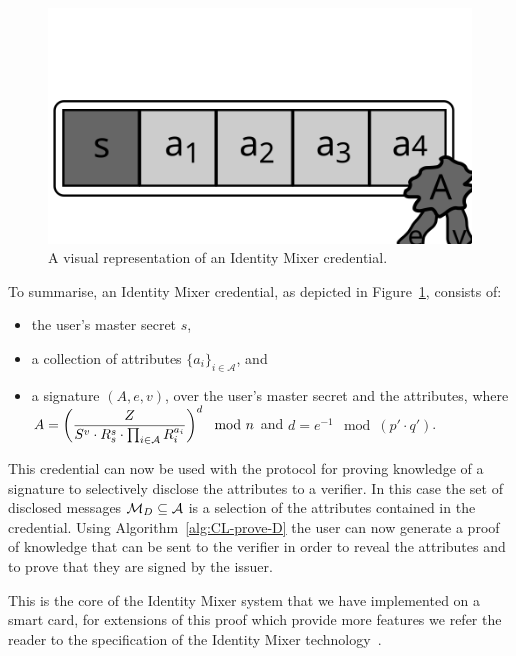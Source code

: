 \clearpage
\begin{figure}[ht]
  \centering
  \includegraphics[scale=.45]{images/idemix-credential}
  \caption{A visual representation of an Identity Mixer credential.}
  \label{fig:idemix-credential}
\end{figure}

\noindent To summarise, an Identity Mixer credential, as depicted in
Figure~\ref{fig:idemix-credential}, consists of:
\begin{itemize}
  \item the user's master secret $s$,
  \item a collection of attributes $\{a_i\}_{i \in \mathcal{A}}$, and
  \item a signature $(A, e, v)$, over the user's master secret and the attributes, where
    $A = \left(\dfrac{Z}{S^v \cdot R_s^{s} \cdot \prod_{i \in \mathcal{A}} R_i^{a_i}}\right)^d \mod n$
    and $d = e^{-1} \mod (p' \cdot q')$.
\end{itemize}

This credential can now be used with the protocol for proving knowledge of a
signature to selectively disclose the attributes to a verifier. In this case the
set of disclosed messages $\mathcal{M}_D \subseteq \mathcal{A}$ is a selection of the
attributes contained in the credential. Using Algorithm~\ref{alg:CL-prove-D} the
user can now generate a proof of knowledge that can be sent to the verifier in
order to reveal the attributes and to prove that they are signed by the issuer.

This is the core of the Identity Mixer system that we have implemented on a
smart card, for extensions of this proof which provide more features we refer
the reader to the specification of the Identity Mixer
technology~\cite{IdemixCrypto2012}.

